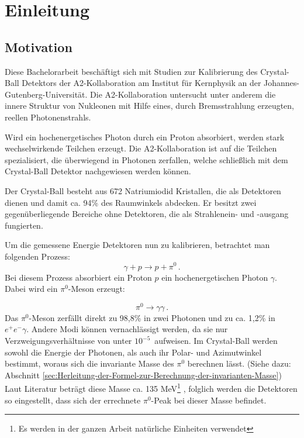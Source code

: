 \documentclass[a4paper,11pt,oneside,final,german,openbib,pdftex]{scrbook}
\begin{document}
\mainmatter
\sloppy

\chapter{Einleitung}

\section{Motivation}
{
	Diese Bachelorarbeit beschäftigt sich mit Studien zur Kalibrierung des Crystal-Ball Detektors der A2-Kollaboration am Institut für Kernphysik an der Johannes-Gutenberg-Universität.
	Die A2-Kollaboration untersucht unter anderem die innere Struktur von Nukleonen mit Hilfe eines, durch Bremsstrahlung erzeugten, reellen Photonenstrahls. 
	
	Wird ein hochenergetisches Photon durch ein Proton absorbiert, werden stark wechselwirkende Teilchen erzeugt. 
	Die A2-Kollaboration ist auf die Teilchen spezialisiert, die \"uberwiegend in Photonen zerfallen, welche schließlich mit dem Crystal-Ball Detektor nachgewiesen werden können. 
	
	Der Crystal-Ball besteht aus 672 Natriumiodid Kristallen, die als Detektoren dienen und damit ca. 94\% des Raumwinkels abdecken.
	Er besitzt zwei gegen\"uberliegende Bereiche ohne Detektoren, die als Strahlenein- und -ausgang fungierten.
	
	Um die gemessene Energie Detektoren nun zu kalibrieren, betrachtet man folgenden Prozess:
\begin{equation}
	\gamma + p \rightarrow p + \pi^0 \,.
	\label{eq.gammascattering}
\end{equation} 
Bei diesem Prozess absorbiert ein Proton $p$ ein hochenergetischen Photon $\gamma$. Dabei wird ein $\pi^0$-Meson erzeugt:

	\begin{equation}
		\pi^0\rightarrow \gamma \gamma \,.
		\label{eq.pi0decay}
	\end{equation}
Das $\pi^0$-Meson zerfällt direkt zu 98,8\% in zwei Photonen und zu ca. 1,2\% in $e^+e^- \gamma$. Andere Modi können vernachlässigt werden, da sie nur Verzweigungsverh\"altnisse von unter $10^{-5}$\ aufweisen. Im Crystal-Ball werden sowohl die Energie der Photonen, als auch ihr Polar- und Azimutwinkel bestimmt, woraus sich die invariante Masse des $\pi^0$ berechnen lässt. (Siehe dazu: Abschnitt \ref{sec:Herleitung-der-Formel-zur-Berechnung-der-invarianten-Masse})
Laut Literatur betr\"agt diese Masse ca. 135 MeV\footnote{Es werden in der ganzen Arbeit nat\"urliche Einheiten verwendet} \cite{PDG16}, folglich werden die Detektoren so eingestellt, dass sich der errechnete $\pi^0$-Peak bei dieser Masse befindet. 

}
\end{document}
